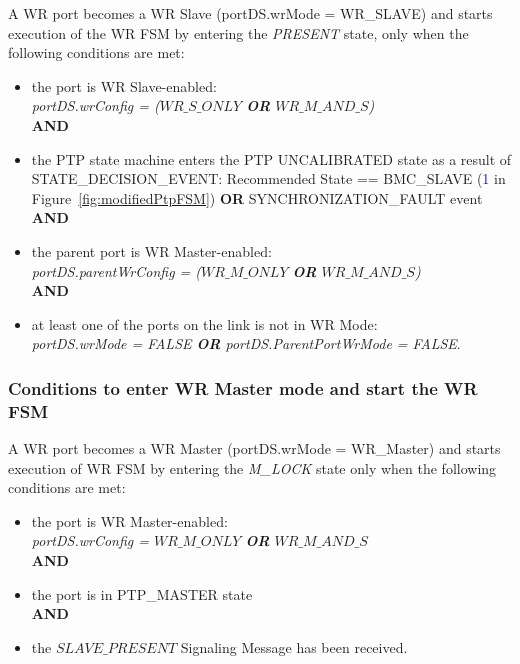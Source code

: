 \documentclass[a4paper, 12pt]{article}
\begin{document}
A WR port becomes a WR Slave (portDS.wrMode = WR\_SLAVE) and starts execution 
of the WR FSM by entering the \textit{PRESENT} state, only when the following conditions are met:
\begin{itemize}
\item the port is WR Slave-enabled: \\ 
      \textit{portDS.wrConfig = ($WR\_S\_ONLY$ \textbf{OR} $WR\_M\_AND\_S$)}\\ 
      \textbf{AND}
\item the PTP state machine enters the PTP UNCALIBRATED state as a result of \\
      STATE\_DECISION\_EVENT:
      Recommended State == BMC\_SLAVE (\textcolor{blue}{1} in Figure~\ref{fig:modifiedPtpFSM})
      \textbf{OR} SYNCHRONIZATION\_FAULT event\\
      \textbf{AND}
\item the parent port is WR Master-enabled: \\ 
      \textit{portDS.parentWrConfig = ($WR\_M\_ONLY$ \textbf{OR} $WR\_M\_AND\_S$)} \\ 
      \textbf{AND}
\item at least one of the ports on the link is not in WR Mode:  \\ 
      \textit{portDS.wrMode = FALSE \textbf{OR} portDS.ParentPortWrMode = FALSE}.
\end{itemize}

\newpage

\subsubsection{Conditions to enter WR Master mode and start the WR FSM}
\label{sec:wrMasterFSMstart}

A WR port becomes a WR Master (portDS.wrMode = WR\_Master) and starts execution of WR FSM
by entering the \textit{M\_LOCK} state only when the following conditions are met:
\begin{itemize}
\item the port is WR Master-enabled:\\
      \textit{portDS.wrConfig = $WR\_M\_ONLY$ \textbf{OR} $WR\_M\_AND\_S$} \\ 
      \textbf{AND}
\item the port is in PTP\_MASTER state \\
      \textbf{AND}
\item the $SLAVE\_PRESENT$ Signaling Message has been received. 
\end{itemize}
\end{document}
